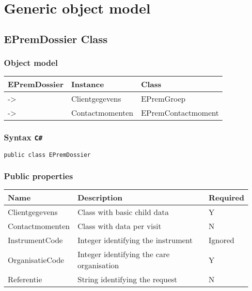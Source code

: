 \documentclass[
]{book}
\begin{document}
\hypertarget{generic-object-model}{%
\section{Generic object model}\label{generic-object-model}}

\hypertarget{epremdossier-class}{%
\subsection{EPremDossier Class}\label{epremdossier-class}}

\hypertarget{object-model}{%
\subsubsection{Object model}\label{object-model}}

\begin{longtable}[]{@{}lll@{}}
\toprule
EPremDossier & Instance & Class \\
\midrule
\endhead
-\textgreater{} & Clientgegevens & EPremGroep \\
-\textgreater{} & Contactmomenten & EPremContactmoment \\
\bottomrule
\end{longtable}

\hypertarget{syntax-c}{%
\subsubsection{\texorpdfstring{Syntax \texttt{C\#}}{Syntax C\#}}\label{syntax-c}}

\texttt{public\ class\ EPremDossier}

\hypertarget{public-properties}{%
\subsubsection{Public properties}\label{public-properties}}

\begin{longtable}[]{@{}lll@{}}
\toprule
Name & Description & Required \\
\midrule
\endhead
Clientgegevens & Class with basic child data & Y \\
Contactmomenten & Class with data per visit & N \\
InstrumentCode & Integer identifying the instrument & Ignored \\
OrganisatieCode & Integer identifying the care organisation & Y \\
Referentie & String identifying the request & N \\
\bottomrule
\end{longtable}
\end{document}
